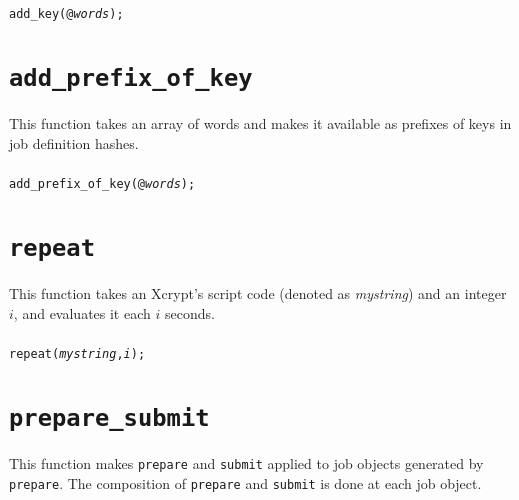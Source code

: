 \documentclass[a4paper,10pt]{report}
\begin{document}
\begin{boxnote}
\begin{alltt}
add_key(@\textit{words});
\end{alltt}
\end{boxnote}
\vspace{\baselineskip}

\section{\texttt{add\_prefix\_of\_key}}

This function takes an array of words and makes it available as
prefixes of keys in job definition hashes.

\subsubsection{\format}

\begin{boxnote}
\begin{alltt}
add_prefix_of_key(@\textit{words});
\end{alltt}
\end{boxnote}
\vspace{\baselineskip}

\section{\texttt{repeat}}

This function takes an Xcrypt's script code (denoted as
\textit{mystring}) and an integer $i$, and evaluates it each $i$ seconds.

\subsubsection{\format}

\begin{boxnote}
\begin{alltt}
repeat(\textit{mystring}, \textit{i});
\end{alltt}
\end{boxnote}
\vspace{\baselineskip}

\section{\texttt{prepare\_submit}}

This function makes \texttt{prepare} and \texttt{submit} applied to
job objects generated by \texttt{prepare}.  The composition of
\texttt{prepare} and \texttt{submit} is done at each job object.
\end{document}
